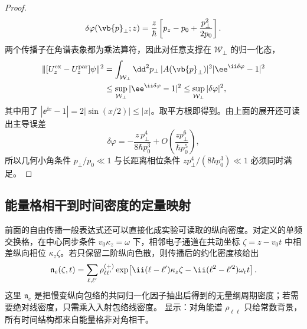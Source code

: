 \begin{proof}
\begin{equation*}
\delta\varphi(\vb{p}_\perp;z)
=\frac{z}{\hbar}
\left[p_z-p_0+\frac{p_\perp^2}{2p_0}\right].
\end{equation*}
两个传播子在角谱表象都为乘法算符，因此对任意支撑在 $\mathcal W_\perp$ 的归一化态，
\begin{align*}
\|[U_z^{\rm ex}-U_z^{\rm par}]\psi\|^2
&=\int_{\mathcal W_\perp}\dd^2 p_\perp\,
|A(\vb{p}_\perp)|^2
|\ee^{\ii\delta\varphi}-1|^2\\
&\le \sup_{\mathcal W_\perp}|\ee^{\ii\delta\varphi}-1|^2
\le \sup_{\mathcal W_\perp}|\delta\varphi|^2,
\end{align*}
其中用了 $|\ee^{\ii x}-1|=2|\sin(x/2)|\le|x|$。取平方根即得到。由上面的展开还可读出主导误差
\begin{equation*}
\delta\varphi
=-\frac{z\,p_\perp^4}{8\hbar p_0^3}
+O\!\left(\frac{z p_\perp^6}{\hbar p_0^5}\right),
\end{equation*}
所以几何小角条件 $p_\perp/p_0\ll1$ 与长距离相位条件 $z p_\perp^4/(8\hbar p_0^3)\ll1$ 必须同时满足。
\end{proof}


\subsection{能量格相干到时间密度的定量映射}\label{subsec:sideband-to-temporal-density-dp46}



前面的自由传播一般表达式还可以直接化成实验可读取的纵向密度。对定义的单频交换格，在中心同步条件 $v_0\kappa_z=\omega$ 下，相邻电子通道在共动坐标 $\zeta=z-v_0t$ 中相差纵向相位 $\kappa_z\zeta$。若只保留二阶纵向色散，则传播后的约化密度核给出
\begin{equation}
{
 \mathfrak n_e(\zeta,t)
 =\sum_{\ell,\ell'}
 \rho_{\ell\ell'}^{(+)}
 \exp\!\left[\ii(\ell-\ell')\kappa_z\zeta
 -\ii(\ell^2-\ell'^2)\omega_{\rm r}t\right].}
\label{eq:sideband_to_longitudinal_density_dp46}
\end{equation}
这里 $\mathfrak n_e$ 是把慢变纵向包络的共同归一化因子抽出后得到的无量纲周期密度；若需要绝对线密度，只需乘入入射包络线密度。 显示：对角能谱 $\rho_{\ell\ell}$ 只给常数背景，所有时间结构都来自能量格非对角相干。

